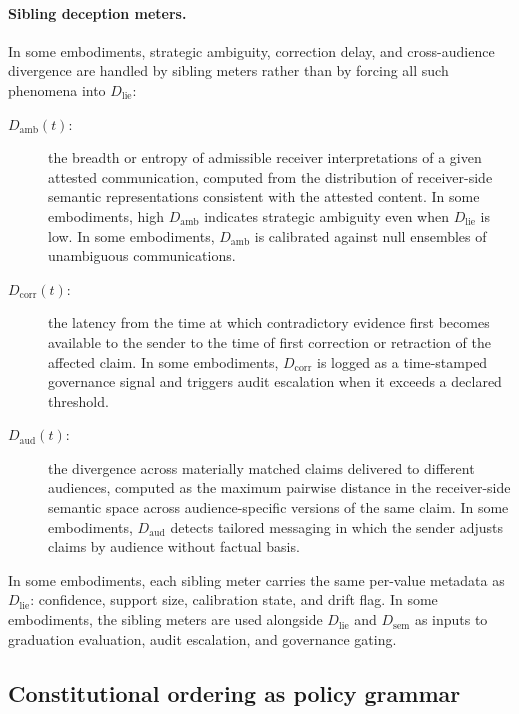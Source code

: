 \documentclass[a4paper,12pt]{article}
\begin{document}
\paragraph{Sibling deception meters.}
In some embodiments, strategic ambiguity, correction delay, and
cross-audience divergence are handled by sibling meters rather than by
forcing all such phenomena into $D_{\mathrm{lie}}$:
\begin{description}
  \item[$D_{\mathrm{amb}}(t)$:] the breadth or entropy of admissible
    receiver interpretations of a given attested communication,
    computed from the distribution of receiver-side semantic
    representations consistent with the attested content. In some
    embodiments, high $D_{\mathrm{amb}}$ indicates strategic ambiguity
    even when $D_{\mathrm{lie}}$ is low. In some embodiments,
    $D_{\mathrm{amb}}$ is calibrated against null ensembles of
    unambiguous communications.
  \item[$D_{\mathrm{corr}}(t)$:] the latency from the time at which
    contradictory evidence first becomes available to the sender to
    the time of first correction or retraction of the affected claim.
    In some embodiments, $D_{\mathrm{corr}}$ is logged as a
    time-stamped governance signal and triggers audit escalation when
    it exceeds a declared threshold.
  \item[$D_{\mathrm{aud}}(t)$:] the divergence across materially
    matched claims delivered to different audiences, computed as the
    maximum pairwise distance in the receiver-side semantic space
    across audience-specific versions of the same claim. In some
    embodiments, $D_{\mathrm{aud}}$ detects tailored messaging in
    which the sender adjusts claims by audience without factual basis.
\end{description}
In some embodiments, each sibling meter carries the same per-value
metadata as $D_{\mathrm{lie}}$: confidence, support size, calibration
state, and drift flag. In some embodiments, the sibling meters are
used alongside $D_{\mathrm{lie}}$ and $D_{\mathrm{sem}}$ as inputs to
graduation evaluation, audit escalation, and governance gating.

\subsection{Constitutional ordering as policy grammar}
\label{sec:constitutional}
\end{document}
